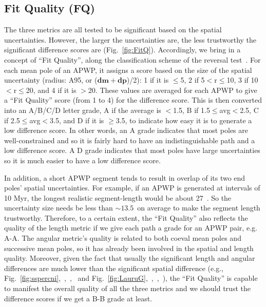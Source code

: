 \subsection{Fit Quality (FQ)}\label{sec:FQ}

The three metrics are all tested to be significant based on the spatial
uncertainties. However, the larger the uncertainties are, the less trustworthy
the significant difference scores are (Fig.~\ref{fig:FitQ}). Accordingly, we
bring in a concept of ``Fit Quality'', along the classification scheme of the
reversal test~\citep{M90}. For each mean pole of an APWP, it assigns a score
based on the size of the spatial uncertainty (radius: A95, or
($\mathbf{dm}+\mathbf{dp}$)/2): 1 if
it is $\leq$5\degree, 2 if 5\degree$<$r$\leq$10\degree, 3 if
10\degree$<$r$\leq$20\degree, and 4 if it is $>$20\degree. These values are
averaged for each APWP to give a ``Fit Quality'' score (from 1 to 4) for the
difference score. This is then converted into an A/B/C/D letter grade, A if the
average is $<$1.5, B if 1.5$\leq$avg$<$2.5, C if 2.5$\leq$avg$<$3.5, and D if it
is $\geq$3.5, to indicate how easy it is to generate a low difference score. In
other words, an A grade indicates that most poles are well-constrained and so it
is fairly hard to have an indistinguishable path and a low difference score. A D
grade indicates that most poles have large uncertainties so it is much easier to
have a low difference score.

In addition, a short APWP segment tends to result in overlap of its two end
poles' spatial uncertainties. For example, if an APWP is generated at intervals
of 10 Myr, the longest realistic segment-length would be about
27\degree~\cite[the maximum rate of plate movement is about 30 cm/yr]{S09,K14}.
So the uncertainty size needs be less than ${\sim}13.5$\degree\ on average to
make the segment length trustworthy. Therefore, to a certain extent, the ``Fit
Quality'' also reflects the quality of the length metric if we give each path a
grade for an APWP pair, e.g. A-A. The angular metric’s quality is related to
both coeval mean poles and successive mean poles, so it has already been
involved in the spatial and length quality. Moreover, given the fact that
usually the significant length and angular differences are much lower than
the significant spatial difference (e.g.,
Fig.~\ref{fig:sspercni},~,~,~
and Fig.~\ref{fig:LauruG},~,~,~),
the ``Fit Quality'' is capable to manifest the overall quality of all the three
metrics and we should trust the difference scores if we get a B-B grade at
least.

